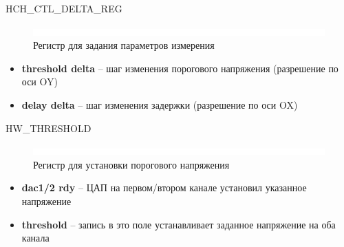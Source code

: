 \begin{register}{H}{CH\_CTL\_DELTA\_REG}{}%
\label{example}%
%
%
%
 \regnewline%

\end{register}


\begin{figure}[ht!] 
	\center
	\includegraphics  {my_folder/images//blank}
	\caption{Регистр для задания параметров измерения} 
	\label{fig:delta-reg}  
\end{figure}
\FloatBarrier

\noindent
\begin{itemize}[label={}]
	\item \textbf{threshold delta} -- шаг изменения порогового напряжения (разрешение по оси OY)
	\item \textbf{delay delta} -- шаг изменения задержки (разрешение по оси OX)\\
\end{itemize}


\begin{register}{H}{W\_THRESHOLD}{}%
\label{example}%
%
%
%
 \regnewline%

%
%
\regnewline%
\end{register}

\begin{figure}[ht!] 
	\center
	\includegraphics  {my_folder/images//blank}
	\caption{Регистр для установки порогового напряжения} 
	\label{fig:thr-reg}  
\end{figure}
\FloatBarrier
\noindent
\begin{itemize}[label={}]
	\item \textbf{dac1/2 rdy} -- ЦАП на первом/втором канале установил указанное напряжение
	\item \textbf{threshold} -- запись в это поле устанавливает заданное напряжение на оба канала\\
\end{itemize}
\newpage
\FloatBarrier

